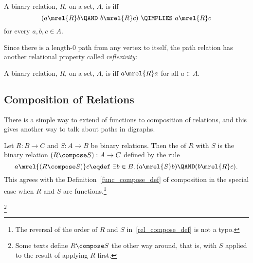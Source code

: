 \begin{definition}
A binary relation, $R$, on a set, $A$, is
 iff
\[
(a \mrel{R}  b \QAND\ b \mrel{R}  c)\ \QIMPLIES\  a \mrel{R}  c
\]
\quad for every $a,b,c\in A$.
\end{definition}

Since there is a length-0 path from any vertex to itself, the path
relation has another relational property called \emph{reflexivity}:

\begin{definition}
A binary relation, $R$, on a set, $A$, is  iff $a
\mrel{R} a$ for all $a \in A$.
\end{definition}

\subsection{Composition of Relations}\label{relation_compose_subsec}
There is a simple way to extend  of functions to
composition of relations, and this gives another way to talk about
paths in digraphs.

Let $R: B\to C$ and $S: A \to B$ be binary relations.  Then the
 of $R$ with $S$ is the binary relation $(R \compose
S): A\to C$ defined by the rule
\begin{equation}\label{rel_compose_def}
a \mrel{(R \compose S)} c \eqdef\ \exists b \in B.\, (a \mrel{S} b)
\QAND (b \mrel{R} c).
\end{equation}
This agrees with the Definition~\ref{func_compose_def} of composition
in the special case when $R$ and $S$ are functions.\footnote{The
  reversal of the order of $R$ and $S$ in~\eqref{rel_compose_def} is
  not a typo.}

\begin{staffnotes}

\footnote{Some texts define $R \compose S$ the other way around, that
  is, with $S$ applied to the result of applying $R$ first.}

\end{staffnotes}

